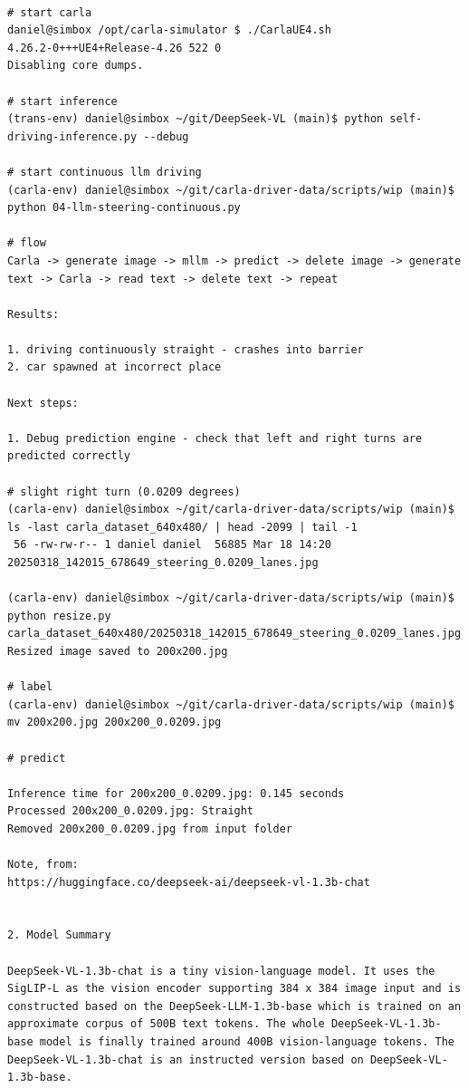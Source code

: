 \begin{verbatim}

# start carla
daniel@simbox /opt/carla-simulator $ ./CarlaUE4.sh 
4.26.2-0+++UE4+Release-4.26 522 0
Disabling core dumps.

# start inference
(trans-env) daniel@simbox ~/git/DeepSeek-VL (main)$ python self-driving-inference.py --debug

# start continuous llm driving
(carla-env) daniel@simbox ~/git/carla-driver-data/scripts/wip (main)$ python 04-llm-steering-continuous.py

# flow
Carla -> generate image -> mllm -> predict -> delete image -> generate text -> Carla -> read text -> delete text -> repeat

Results:

1. driving continuously straight - crashes into barrier
2. car spawned at incorrect place

Next steps:

1. Debug prediction engine - check that left and right turns are predicted correctly

# slight right turn (0.0209 degrees)
(carla-env) daniel@simbox ~/git/carla-driver-data/scripts/wip (main)$ ls -last carla_dataset_640x480/ | head -2099 | tail -1
 56 -rw-rw-r-- 1 daniel daniel  56885 Mar 18 14:20 20250318_142015_678649_steering_0.0209_lanes.jpg

(carla-env) daniel@simbox ~/git/carla-driver-data/scripts/wip (main)$ python resize.py carla_dataset_640x480/20250318_142015_678649_steering_0.0209_lanes.jpg
Resized image saved to 200x200.jpg

# label
(carla-env) daniel@simbox ~/git/carla-driver-data/scripts/wip (main)$ mv 200x200.jpg 200x200_0.0209.jpg

# predict

Inference time for 200x200_0.0209.jpg: 0.145 seconds
Processed 200x200_0.0209.jpg: Straight
Removed 200x200_0.0209.jpg from input folder

Note, from:
https://huggingface.co/deepseek-ai/deepseek-vl-1.3b-chat


2. Model Summary

DeepSeek-VL-1.3b-chat is a tiny vision-language model. It uses the SigLIP-L as the vision encoder supporting 384 x 384 image input and is constructed based on the DeepSeek-LLM-1.3b-base which is trained on an approximate corpus of 500B text tokens. The whole DeepSeek-VL-1.3b-base model is finally trained around 400B vision-language tokens. The DeepSeek-VL-1.3b-chat is an instructed version based on DeepSeek-VL-1.3b-base.



\end{verbatim}
